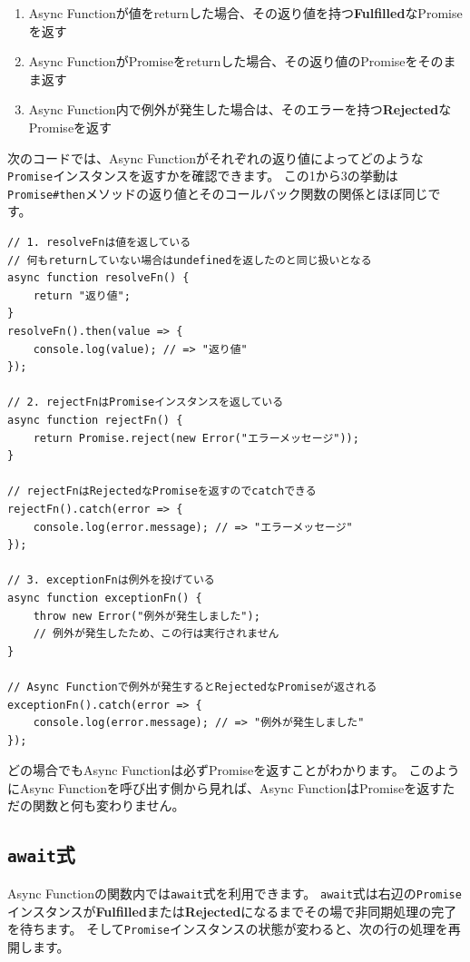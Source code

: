 \begin{enumerate}
\def\labelenumi{\arabic{enumi}.}
\item
  Async
  Functionが値をreturnした場合、その返り値を持つ\textbf{Fulfilled}なPromiseを返す
\item
  Async
  FunctionがPromiseをreturnした場合、その返り値のPromiseをそのまま返す
\item
  Async
  Function内で例外が発生した場合は、そのエラーを持つ\textbf{Rejected}なPromiseを返す
\end{enumerate}

次のコードでは、Async
Functionがそれぞれの返り値によってどのような\texttt{Promise}インスタンスを返すかを確認できます。
この1から3の挙動は\texttt{Promise\#then}メソッドの返り値とそのコールバック関数の関係とほぼ同じです。

\begin{lstlisting}
// 1. resolveFnは値を返している
// 何もreturnしていない場合はundefinedを返したのと同じ扱いとなる
async function resolveFn() {
    return "返り値";
}
resolveFn().then(value => {
    console.log(value); // => "返り値"
});

// 2. rejectFnはPromiseインスタンスを返している
async function rejectFn() {
    return Promise.reject(new Error("エラーメッセージ"));
}

// rejectFnはRejectedなPromiseを返すのでcatchできる
rejectFn().catch(error => {
    console.log(error.message); // => "エラーメッセージ"
});

// 3. exceptionFnは例外を投げている
async function exceptionFn() {
    throw new Error("例外が発生しました");
    // 例外が発生したため、この行は実行されません
}

// Async Functionで例外が発生するとRejectedなPromiseが返される
exceptionFn().catch(error => {
    console.log(error.message); // => "例外が発生しました"
});
\end{lstlisting}

どの場合でもAsync Functionは必ずPromiseを返すことがわかります。
このようにAsync Functionを呼び出す側から見れば、Async
FunctionはPromiseを返すただの関数と何も変わりません。

\hypertarget{await-expression}{%
\subsection{\texorpdfstring{\texttt{await}式}{await式}}\label{await-expression}}

Async
Functionの関数内では\texttt{await}式を利用できます。
\texttt{await}式は右辺の\texttt{Promise}インスタンスが\textbf{Fulfilled}または\textbf{Rejected}になるまでその場で非同期処理の完了を待ちます。
そして\texttt{Promise}インスタンスの状態が変わると、次の行の処理を再開します。

